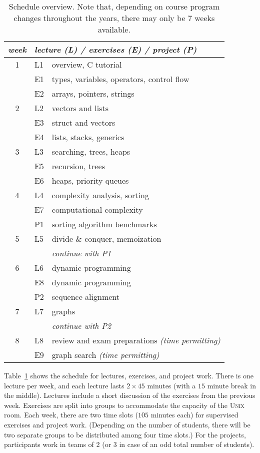 \documentclass[a4paper]{article}
\begin{document}
\begin{table}
  \centering
  \begin{tabular}{|cll|}
    \hline
    \emph{week} & \multicolumn{2}{l|}{\emph{lecture (L) / exercises (E) / project (P)}} \\
    \hline
    1  & L1 & overview, C tutorial \\
       & E1 & types, variables, operators, control flow \\
       & E2 & arrays, pointers, strings \\
    \hline
    2  & L2 & vectors and lists \\
       & E3 & struct and vectors \\
       & E4 & lists, stacks, generics  \\
    \hline
    3  & L3 & searching, trees, heaps \\
       & E5 & recursion, trees \\
       & E6 & heaps, priority queues \\
    \hline
    4  & L4 & complexity analysis, sorting \\
       & E7 & computational complexity \\
       & P1 & sorting algorithm benchmarks \\
    \hline
    5  & L5 & divide \& conquer, memoization \\
       &    & \emph{continue with P1} \\
    \hline
    6  & L6 & dynamic programming \\
       & E8 & dynamic programming \\
       & P2 & sequence alignment \\
    \hline
    7  & L7 & graphs \\
       &    & \emph{continue with P2} \\
    \hline
    8  & L8 & review and exam preparations \emph{(time permitting)} \\
       & E9 & graph search \emph{(time permitting)} \\
    \hline
  \end{tabular}
  \caption{
    Schedule overview.
    Note that, depending on course program changes throughout the years, there may only be 7 weeks available.
  }\label{tab:schedule}
\end{table}

Table~\ref{tab:schedule} shows the schedule for lectures, exercises, and project work.
There is one lecture per week, and each lecture lasts $2\times 45$ minutes (with a $15$ minute break in the middle).
Lectures include a short discussion of the exercises from the previous week.
Exercises are split into groups to accommodate the capacity of the \textsc{Unix} room.
Each week, there are two time slots ($105$ minutes each) for supervised exercises and project work.
(Depending on the number of students, there will be two separate groups to be distributed among four time slots.)
For the projects, participants work in teams of 2 (or 3 in case of an odd total number of students).
\end{document}
